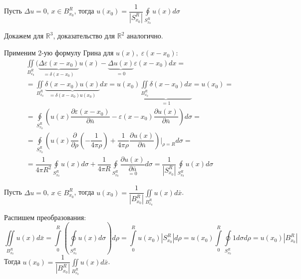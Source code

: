 \begin{theorem}
	$\;$\\
	Пусть $ \Delta u = 0$, $x \in B_{x_0}^R$, тогда 
	$\displaystyle u(x_0) = \dfrac{1}{|S_{x_0}^R|} \oint\limits_{S_{x_0}^R} u(x)d\sigma$
\end{theorem}
\begin{Proof}
	Докажем для $\mathbb{R}^3$, доказательство для $\mathbb{R}^2$ аналогично.

	Применим 2-ую формулу Грина для $ u(x), \; \varepsilon(x - x_0)$:
	$$\begin{gathered}
		\iint \limits_{B_{x_0}^R}( \underbrace{\Delta \varepsilon(x - x_0)}_{= \delta(x - x_0)}u(x) - \underbrace{\Delta u(x)}_{= 0}\varepsilon(x - x_0)dx 
		= \\
		= \iint \limits_{B_{x_0}^R} \underbrace{\delta(x - x_0)u(x)}_{=\delta(x - x_0)u(x_0)}dx
		= u(x_0)\underbrace{\iint \limits_{B_{x_0}^R} \delta(x - x_0)dx}_{=1} = u(x_0) 
		= \\
		= \oint\limits_{S_{x_0}^R}\left(u(x)\dfrac{\partial \varepsilon(x - x_0)}{\partial \bar{n}} - \varepsilon(x - x_0) \dfrac{\partial u(x)}{\partial \bar{n}}\right)d\sigma = \\
		= \oint\limits_{S_{x_0}^R} \left(u(x) \dfrac{\partial}{\partial \rho}(-\dfrac{1}{4\pi \rho}) + \dfrac{1}{4\pi \rho} \dfrac{\partial u(x)}{\partial \bar{n}} \right) \Big|_{\rho = R}d\sigma = \\
		= \dfrac{1}{4\pi R^2} \oint\limits_{S_{x_0}^R} u(x)d\sigma + \dfrac{1}{4\pi R} \oint\limits_{S_{x_0}^R} \underset{= 0}{\dfrac{\partial u(x)}{\partial \bar{n}}}d\sigma = \dfrac{1}{|S_{x_0}^R|} \oint\limits_{S_{x_0}^R} u(x)d\sigma
	\end{gathered}$$
\end{Proof}

\vspace{0.5cm}
\begin{theorem}
	$\;$\\
	Пусть $ \Delta u = 0$, $x \in B_{x_0}^R$, тогда 
	$\displaystyle u(x_0) = \dfrac{1}{|B_{x_0}^R|} \iint \limits_{B_{x_0}^R} u(x)d\bar{x}$.
\end{theorem}
\begin{Proof}
	Распишем преобразования:
	$$\iint \limits_{B_{x_0}^R} u(x)d\bar{x} = \int\limits_{0}^R (\oint\limits_{S_{x_0}^R} u(x)d\sigma)d\rho = \int\limits_{0}^R u(x_0) |S_{x_0}^R| d\rho = u(x_0) \int\limits_{0}^R \oint\limits_{S_{x_0}^R} 1 d\sigma d\rho = u(x_0)|B_{x_0}^R|$$
	Тогда $\displaystyle u(x_0) = \dfrac{1}{|B_{x_0}^R|} \iint \limits_{B_{x_0}^R} u(x)d\bar{x}$.
\end{Proof}


